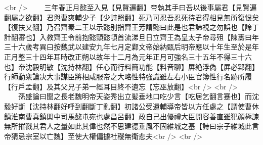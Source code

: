 <br />
　　三年春正月懿至入見【見賢遍翻】帝執其手曰吾以後事屬君【見賢遍翻屬之欲翻】君與曹爽輔少子【少詩照翻】死乃可忍吾忍死待君得相見無所復恨矣【復扶又翻】乃召齊秦二王以示懿别指齊王芳謂懿曰此是也君諦視之勿誤也【諦丁計翻審也】入教齊王令前抱懿頸懿頓首流涕旦日立齊王為皇太子帝尋殂【陳夀曰年三十六歲考異曰按魏武以建安九年七月定鄴文帝始納甄后明帝應以十年生至於是年正月整三十四年耳時改正朔以故年十二月為元年正月可強名三十五年不得三十六也】帝沈毅明敏【沈持林翻】任心而行料簡功能【料音聊】屏絶浮偽【屛必郢翻】行師動衆論决大事謀臣將相咸服帝之大略性特強識雖左右小臣官簿性行名跡所履【行戶孟翻】及其父兄子弟一經耳目終不遺忘【忘巫放翻】<br />
<br />
　　孫盛論曰聞之長老魏明帝天姿秀出立髪垂地口吃少言【吃居乞翻言蹇也】而沈毅好斷【沈持林翻好呼到翻斷丁亂翻】初諸公受遺輔導帝皆以方任處之【謂使曹休鎮淮南曹真鎮閧中司馬懿屯宛也處昌呂翻】政自己出優禮大臣開容善直雖犯顔極諫無所摧戮其君人之量如此其偉也然不思建德垂風不固維城之基【詩曰宗子維城此言帝猜忌宗室以亡魏】至使大權偏據社稷無衛悲夫<br />
<br />
